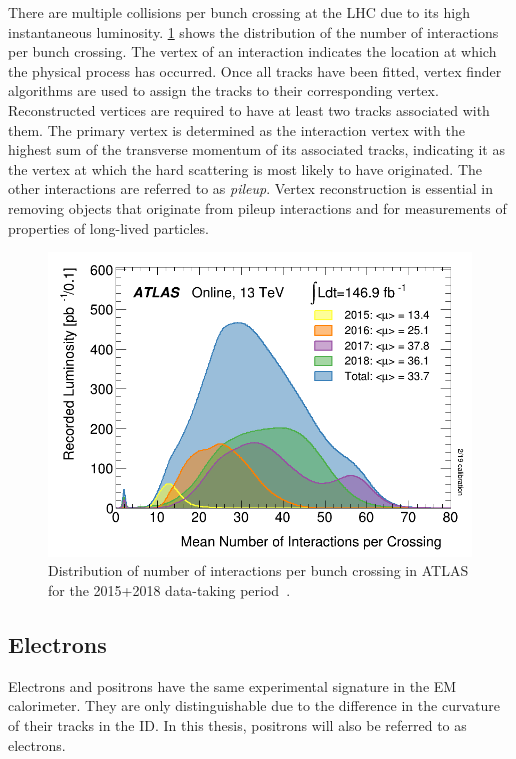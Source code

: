 There are multiple \protonproton collisions per bunch crossing at the LHC due to its high instantaneous luminosity. \cref{fig:method:ATLAS-pileup} shows the distribution of the number of interactions per bunch crossing. The vertex of an interaction indicates the location at which the physical process has occurred. Once all tracks have been fitted, vertex finder algorithms are used to assign the tracks to their corresponding vertex. Reconstructed vertices are required to have at least two tracks associated with them. The primary vertex is determined as the \protonproton interaction vertex with the highest sum of the transverse momentum of its associated tracks, indicating it as the vertex at which the hard scattering is most likely to have originated. The other \protonproton interactions are referred to as \emph{pileup}. Vertex reconstruction is essential in removing objects that originate from pileup interactions and for measurements of properties of long-lived particles. 
\begin{figure}[]
    \centering
    \includegraphics[width=\mediumfigwidth]{images/mu_2015_2018.png}
    \caption[Distribution of number of interactions per \protonproton bunch crossing in ATLAS for the 2015+2018 data-taking period]{Distribution of number of interactions per \protonproton bunch crossing in ATLAS for the 2015+2018 data-taking period~\cite{ATLAS:lumiPlots}.}
    \label{fig:method:ATLAS-pileup}
\end{figure}

\subsection{Electrons}\label{sec:reconstruction:electrons}
Electrons and positrons have the same experimental signature in the EM calorimeter. They are only distinguishable due to the difference in the curvature of their tracks in the ID. In this thesis, positrons will also be referred to as electrons.   

